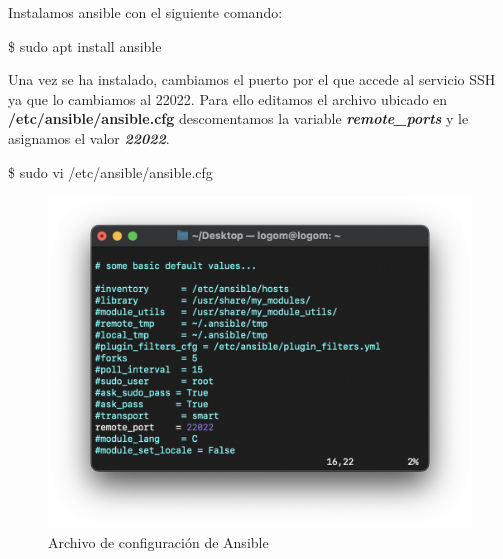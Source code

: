Instalamos ansible con el siguiente comando:
\begin{tcolorbox}[colback=black!10, halign=left]
    \$ sudo apt install ansible
\end{tcolorbox}
Una vez se ha instalado, cambiamos el puerto por el que accede al servicio SSH ya que lo cambiamos al 22022. Para ello editamos
el archivo ubicado en \textbf{/etc/ansible/ansible.cfg} descomentamos la variable \textbf{\emph{remote\_ports}} y le asignamos el valor \textbf{\emph{22022}}.
    \begin{tcolorbox}[colback=black!10, halign=left]
        \$ sudo vi /etc/ansible/ansible.cfg
    \end{tcolorbox}
    \begin{figure}[H]
        \centering
        \includegraphics[scale=0.525]{images/ansible_cfg.png}
        \caption{Archivo de configuración de Ansible}
        \label{fig:ansible_cfg}
    \end{figure}

